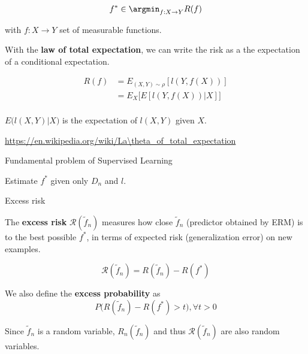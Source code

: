 \documentclass[
10pt, %
a4paper, %
oneside, %
headinclude,footinclude, %
BCOR5mm, %
]{scrartcl}
\begin{document}
\begin{equation}
    f^*\in \argmin_{f:X\rightarrow Y} R(f)
\end{equation}

with $f:X\rightarrow Y$ set of measurable functions.

\begin{remark}
    With the \textbf{{law of total expectation}}, we can write the risk as a the
    expectation of a conditional expectation.

    \begin{equation}
        \begin{aligned}
            \label{eq:}
            R(f) &= E_{(X,Y)\sim \rho}[l(Y,f(X))]\\
            &= E_{X}\Big[E[l(Y,f(X))|X]\Big]\\
        \end{aligned}
    \end{equation}

    $E\big(l(X,Y)|X \big) $ is the expectation of $l(X, Y)$ given $X$.

    \url{https://en.wikipedia.org/wiki/La\theta_of_total_expectation} 
\end{remark}


\begin{definition}{Fundamental problem of Supervised Learning}

    Estimate $f^*$ given only $D_n$ and $l$.
    
\end{definition}

\begin{definition}{Excess risk}

    The \textbf{{excess risk}} $ \mathcal{R} ( \tilde{f}_n)$ measures how close  $ \tilde{f}_n$ (predictor obtained by ERM) is to the best possible $f^*$, in terms of expected risk (generalization error) on new examples.

    \begin{equation}
	\mathcal{R} ( \tilde{f}_n) = R( \tilde{f}_n)-R(f^*)
    \end{equation}

    We also define the \textbf{{excess probability}} as
    \begin{equation*}
	P\big( R( \tilde{f}_n)-R(f^*)>t\big), \forall t>0
    \end{equation*}
\end{definition}

\begin{remark}
Since $ \tilde{f}_n$ is a random variable, $R_n( \tilde{f}_n)$ and thus $ \mathcal{R} (\tilde{f}_n)$ are also random variables.
\end{remark}
\end{document}
